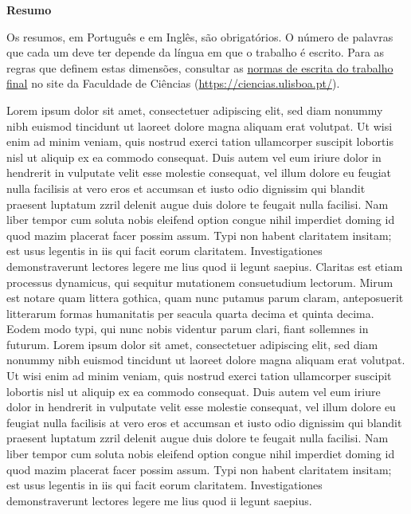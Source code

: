 
\vspace*{2cm}
\begin{center} \Large \bf Resumo
\end{center}
\vspace*{1cm} \setlength{\baselineskip}{0.6cm}


Os resumos, em Português e em Inglês, são obrigatórios. 
O número de palavras que cada um deve ter depende da língua em que o trabalho é escrito.
Para as regras que definem estas dimensões, consultar as \href{https://ciencias.ulisboa.pt/pt/admissao-provas-academicas-2-ciclo}{normas de escrita do trabalho final} no site da Faculdade de Ciências (\url{https://ciencias.ulisboa.pt/}).


Lorem ipsum dolor sit amet, consectetuer adipiscing elit, sed diam nonummy nibh euismod tincidunt ut laoreet dolore magna aliquam erat volutpat. Ut wisi enim ad minim veniam, quis nostrud exerci tation ullamcorper suscipit lobortis nisl ut aliquip ex ea commodo consequat. Duis autem vel eum iriure dolor in hendrerit in vulputate velit esse molestie consequat, vel illum dolore eu feugiat nulla facilisis at vero eros et accumsan et iusto odio dignissim qui blandit praesent luptatum zzril delenit augue duis dolore te feugait nulla facilisi. Nam liber tempor cum soluta nobis eleifend option congue nihil imperdiet doming id quod mazim placerat facer possim assum. Typi non habent claritatem insitam; est usus legentis in iis qui facit eorum claritatem. Investigationes demonstraverunt lectores legere me lius quod ii legunt saepius. Claritas est etiam processus dynamicus, qui sequitur mutationem consuetudium lectorum. Mirum est notare quam littera gothica, quam nunc putamus parum claram, anteposuerit litterarum formas humanitatis per seacula quarta decima et quinta decima. Eodem modo typi, qui nunc nobis videntur parum clari, fiant sollemnes in futurum. Lorem ipsum dolor sit amet, consectetuer adipiscing elit, sed diam nonummy nibh euismod tincidunt ut laoreet dolore magna aliquam erat volutpat. Ut wisi enim ad minim veniam, quis nostrud exerci tation ullamcorper suscipit lobortis nisl ut aliquip ex ea commodo consequat. Duis autem vel eum iriure dolor in hendrerit in vulputate velit esse molestie consequat, vel illum dolore eu feugiat nulla facilisis at vero eros et accumsan et iusto odio dignissim qui blandit praesent luptatum zzril delenit augue duis dolore te feugait nulla facilisi. Nam liber tempor cum soluta nobis eleifend option congue nihil imperdiet doming id quod mazim placerat facer possim assum. Typi non habent claritatem insitam; est usus legentis in iis qui facit eorum claritatem. Investigationes demonstraverunt lectores legere me lius quod ii legunt saepius.


